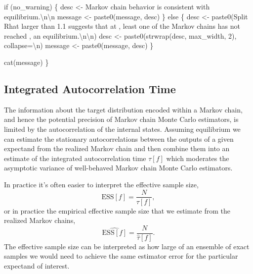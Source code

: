 \documentclass[
  letterpaper,
  DIV=11,
  numbers=noendperiod]{scrartcl}
\newenvironment{Shaded}{\begin{snugshade}}{\end{snugshade}}
\newcommand{\AttributeTok}[1]{\textcolor[rgb]{0.40,0.45,0.13}{#1}}
\newcommand{\ControlFlowTok}[1]{\textcolor[rgb]{0.00,0.23,0.31}{#1}}
\newcommand{\DecValTok}[1]{\textcolor[rgb]{0.68,0.00,0.00}{#1}}
\newcommand{\FunctionTok}[1]{\textcolor[rgb]{0.28,0.35,0.67}{#1}}
\newcommand{\NormalTok}[1]{\textcolor[rgb]{0.00,0.23,0.31}{#1}}
\newcommand{\OtherTok}[1]{\textcolor[rgb]{0.00,0.23,0.31}{#1}}
\newcommand{\SpecialCharTok}[1]{\textcolor[rgb]{0.37,0.37,0.37}{#1}}
\newcommand{\StringTok}[1]{\textcolor[rgb]{0.13,0.47,0.30}{#1}}
\begin{document}
\begin{Shaded}
\begin{Highlighting}[]
  \ControlFlowTok{if}\NormalTok{ (no\_warning) \{}
\NormalTok{    desc }\OtherTok{\textless{}{-}} \StringTok{\textquotesingle{}Markov chain behavior is consistent with equilibrium.}\SpecialCharTok{\textbackslash{}n\textbackslash{}n}\StringTok{\textquotesingle{}}
\NormalTok{    message }\OtherTok{\textless{}{-}} \FunctionTok{paste0}\NormalTok{(message, desc)}
\NormalTok{  \} }\ControlFlowTok{else}\NormalTok{ \{}
\NormalTok{    desc }\OtherTok{\textless{}{-}} \FunctionTok{paste0}\NormalTok{(}\StringTok{\textquotesingle{}Split Rhat larger than 1.1 suggests that at \textquotesingle{}}\NormalTok{,}
                   \StringTok{\textquotesingle{}least one of the Markov chains has not reached \textquotesingle{}}\NormalTok{,}
                   \StringTok{\textquotesingle{}an equilibrium.}\SpecialCharTok{\textbackslash{}n\textbackslash{}n}\StringTok{\textquotesingle{}}\NormalTok{)}
\NormalTok{    desc }\OtherTok{\textless{}{-}} \FunctionTok{paste0}\NormalTok{(}\FunctionTok{strwrap}\NormalTok{(desc, max\_width, }\DecValTok{2}\NormalTok{), }\AttributeTok{collapse=}\StringTok{\textquotesingle{}}\SpecialCharTok{\textbackslash{}n}\StringTok{\textquotesingle{}}\NormalTok{)}
\NormalTok{    message }\OtherTok{\textless{}{-}} \FunctionTok{paste0}\NormalTok{(message, desc)}
\NormalTok{  \}}
  
  \FunctionTok{cat}\NormalTok{(message)}
\NormalTok{\}}
\end{Highlighting}
\end{Shaded}

\hypertarget{integrated-autocorrelation-time}{%
\subsection{Integrated Autocorrelation
Time}\label{integrated-autocorrelation-time}}

The information about the target distribution encoded within a Markov
chain, and hence the potential precision of Markov chain Monte Carlo
estimators, is limited by the autocorrelation of the internal states.
Assuming equilibrium we can estimate the stationary autocorrelations
between the outputs of a given expectand from the realized Markov chain
and then combine them into an estimate of the integrated autocorrelation
time \(\tau[f]\) which moderates the asymptotic variance of well-behaved
Markov chain Monte Carlo estimators.

In practice it's often easier to interpret the effective sample size, \[
\text{ESS}[f] = \frac{N}{\tau[f]},
\] or in practice the empirical effective sample size that we estimate
from the realized Markov chains, \[
\hat{\text{ESS}[f]} = \frac{N}{\hat{\tau}[f]}.
\] The effective sample size can be interpreted as how large of an
ensemble of exact samples we would need to achieve the same estimator
error for the particular expectand of interest.
\end{document}
